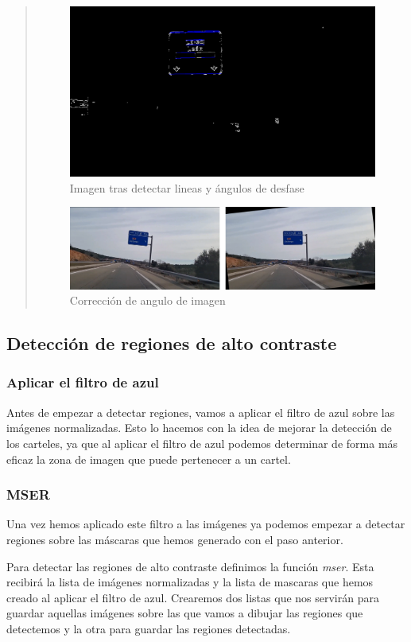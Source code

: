 \documentclass[a4paper, 12pt]{article}
\begin{document}
\begin{quote}
	\begin{figure}[h]
		\centering
		\includegraphics[width=0.6\linewidth]{img/image_with_lines+}
		\caption{Imagen tras detectar lineas y ángulos de desfase}
		\label{fig:imagewithlines}
	\end{figure}
	
	\begin{figure}[h]
		\centering
		\includegraphics[width=0.7\linewidth]{img/00057_co}
		\caption{Corrección de angulo de imagen}
		\label{fig:00057co}
	\end{figure}
	
\end{quote}

\subsection{Detección de regiones de alto contraste}
\subsubsection{Aplicar el filtro de azul}
Antes de empezar a detectar regiones, vamos a aplicar el filtro de azul sobre las imágenes normalizadas. Esto lo hacemos con la idea de mejorar la detección de los carteles, ya que al aplicar el filtro de azul podemos determinar de forma más eficaz la zona de imagen que puede pertenecer a un cartel. 

\subsubsection{MSER}
Una vez hemos aplicado este filtro a las imágenes ya podemos empezar a detectar regiones sobre las máscaras que hemos generado con el paso anterior.

Para detectar las regiones de alto contraste definimos la función \textit{mser}. Esta recibirá la lista de imágenes normalizadas y la lista de mascaras que hemos creado al aplicar el filtro de azul. 
Crearemos dos listas que nos servirán para guardar aquellas imágenes sobre las que vamos a dibujar las regiones que detectemos y la otra para guardar las regiones detectadas. 
\end{document}
